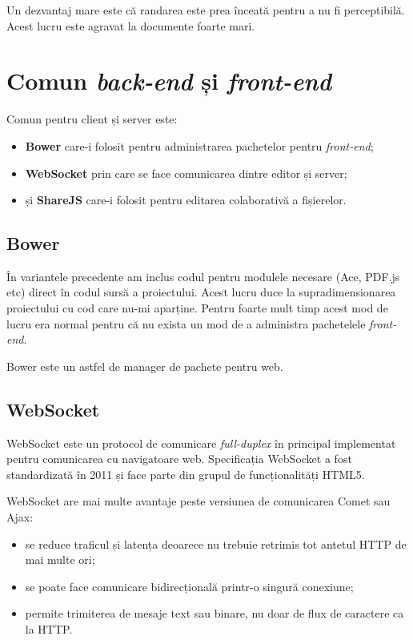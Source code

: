 \documentclass[a4wide,12pt]{report}
\newcommand{\eng}[1]{\emph{#1}} %
\begin{document}
Un dezvantaj mare este că randarea este prea înceată pentru a nu fi
perceptibilă. Acest lucru este agravat la documente foarte mari.

\section{Comun \eng{back-end} și \eng{front-end}}

Comun pentru client și server este:

\begin{itemize}

\item \textbf{Bower} care-i folosit pentru administrarea pachetelor pentru
\eng{front-end};

\item \textbf{WebSocket} prin care se face comunicarea dintre editor și server;

\item și \textbf{ShareJS} care-i folosit pentru editarea colaborativă a
fișierelor.

\end{itemize}

\subsection{Bower}
\label{bowersub}

În variantele precedente am inclus codul pentru modulele necesare (Ace, PDF.js
etc) direct în codul sursă a proiectului. Acest lucru duce la supradimensionarea
proiectului cu cod care nu-mi aparține. Pentru foarte mult timp acest mod de
lucru era normal pentru că nu exista un mod de a administra pachetelele
\eng{front-end}.

Bower este un astfel de manager de pachete pentru web.

\subsection{WebSocket}
\label{websocketsub}

WebSocket este un protocol de comunicare \eng{full-duplex} în principal
implementat pentru comunicarea cu navigatoare web. Specificația WebSocket a fost
standardizată în 2011 și face parte din grupul de funcționalități HTML5.

WebSocket are mai multe avantaje peste versiunea de comunicarea Comet sau Ajax:

\begin{itemize}

\item se reduce traficul și latența deoarece nu trebuie retrimis tot antetul
HTTP de mai multe ori;

\item se poate face comunicare bidirecțională printr-o singură conexiune;

\item permite trimiterea de mesaje text sau binare, nu doar de flux de caractere
ca la HTTP.

\end{itemize}
\end{document}

